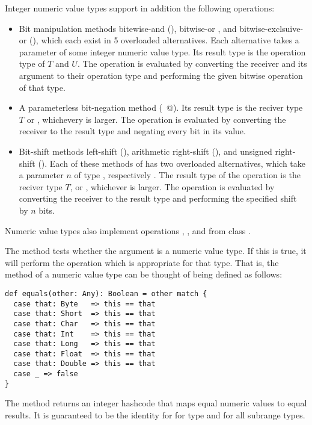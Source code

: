{{{Integer numeric value types support in addition the following operations:
\begin{itemize}
\item 
Bit manipulation methods bitewise-and (\code{&}), bitwise-or
{\code{|}}, and bitwise-exclsuive-or (\code{^}), which each exist in 5
overloaded alternatives. Each alternative takes a parameter of some
integer numeric value type. Its result type is the operation type of
$T$ and $U$. The operation is evaluated by converting the receiver and
its argument to their operation type and performing the given bitwise
operation of that type.
\item
A parameterless bit-negation method (\lstinline@~@). Its result type is
the reciver type $T$ or , whichevery is larger.
The operation is evaluated by converting the receiver to the result
type and negating every bit in its value.
\item
Bit-shift methods left-shift (\code{<<}), arithmetic right-shift
(\code{>>}), and unsigned right-shift (\code{>>>}). Each of these
methods of has two overloaded alternatives, which take a parameter $n$
of type , respectively . The result type of the
operation is the reciver type $T$, or , whichever is larger.
The operation is evaluated by converting the receiver to the result
type and performing the specified shift by $n$ bits.
\end{itemize}

Numeric value types also implement operations ,
, and  from class .

The  method tests whether the argument is a numeric value
type. If this is true, it will perform the \code{==} operation which
is appropriate for that type. That is, the  method of a
numeric value type can be thought of being defined as follows:
\begin{lstlisting}
def equals(other: Any): Boolean = other match {
  case that: Byte   => this == that
  case that: Short  => this == that
  case that: Char   => this == that
  case that: Int    => this == that
  case that: Long   => this == that
  case that: Float  => this == that
  case that: Double => this == that
  case _ => false
}
\end{lstlisting}
The  method returns an integer hashcode that maps equal
numeric values to equal results. It is guaranteed to be the identity for 
for type  and for all subrange types.

}}}
